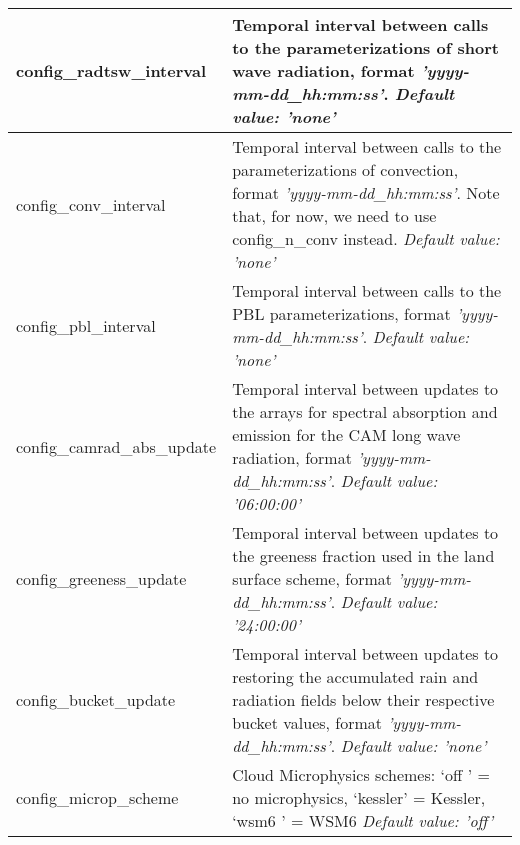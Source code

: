 {\begin{longtable}{|p{2.0in} |p{4.25in}|}
  config\_radtsw\_interval & Temporal interval between calls to the parameterizations of short wave radiation, format {\em 'yyyy-mm-dd\_hh:mm:ss'}. \newline 
  {\em Default value: 'none'} \\ \hline

 config\_conv\_interval & Temporal interval between calls to the parameterizations of convection, format {\em 'yyyy-mm-dd\_hh:mm:ss'}. Note that, for now, we need to use config\_n\_conv instead. \newline
  {\em Default value: 'none'} \\ \hline

  config\_pbl\_interval & Temporal interval between calls to the PBL parameterizations, format {\em 'yyyy-mm-dd\_hh:mm:ss'}.  \newline 
  {\em Default value: 'none'} \\ \hline

  config\_camrad\_abs\_update & Temporal interval between updates to the arrays for spectral absorption and emission for the CAM long wave radiation, format {\em 'yyyy-mm-dd\_hh:mm:ss'}. \newline 
  {\em Default value: '06:00:00'} \\ \hline

  config\_greeness\_update & Temporal interval between updates to the greeness fraction used in the land surface scheme, format {\em 'yyyy-mm-dd\_hh:mm:ss'}. \newline 
  {\em Default value: '24:00:00'} \\ \hline      

  config\_bucket\_update & Temporal interval between updates to restoring the accumulated rain and radiation fields below their respective bucket values, format {\em 'yyyy-mm-dd\_hh:mm:ss'}. \newline 
  {\em Default value: 'none'} \\ \hline      

  config\_microp\_scheme & Cloud Microphysics schemes: \newline
                                             `off '  = no microphysics, \newline
                                             `kessler' = Kessler, \newline 
                                             `wsm6       ' = WSM6 \newline
  {\em Default value: 'off'} \\ \hline


\end{longtable}}
